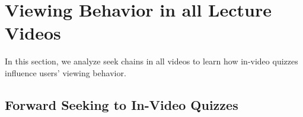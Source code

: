 \documentclass{sigchi}
\begin{document}




\section{Viewing Behavior in all Lecture Videos}

In this section, we analyze seek chains in all videos to learn how in-video quizzes influence users' viewing behavior.



\subsection{Forward Seeking to In-Video Quizzes}
\end{document}
